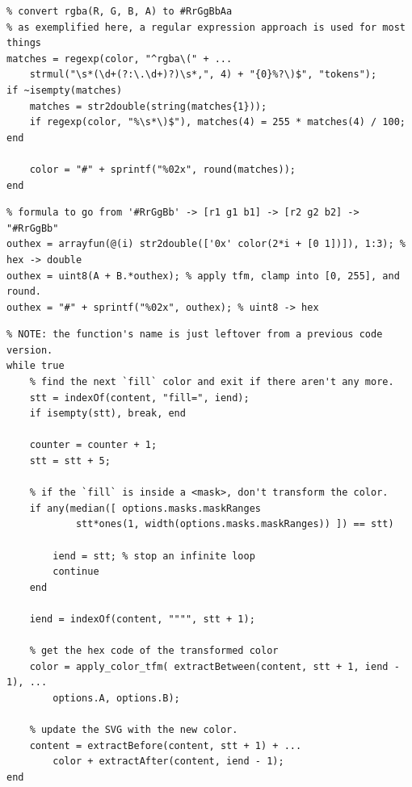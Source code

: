 \documentclass[12pt]{article}
\begin{document}
\vspace{-8px}
\begin{verbatim}
% convert rgba(R, G, B, A) to #RrGgBbAa
% as exemplified here, a regular expression approach is used for most things
matches = regexp(color, "^rgba\(" + ...
    strmul("\s*(\d+(?:\.\d+)?)\s*,", 4) + "{0}%?\)$", "tokens");
if ~isempty(matches)
    matches = str2double(string(matches{1}));
    if regexp(color, "%\s*\)$"), matches(4) = 255 * matches(4) / 100; end

    color = "#" + sprintf("%02x", round(matches));
end
\end{verbatim}
\vfill
{}\vspace{-8px}
\begin{verbatim}
% formula to go from '#RrGgBb' -> [r1 g1 b1] -> [r2 g2 b2] -> "#RrGgBb"
outhex = arrayfun(@(i) str2double(['0x' color(2*i + [0 1])]), 1:3); % hex -> double
outhex = uint8(A + B.*outhex); % apply tfm, clamp into [0, 255], and round.
outhex = "#" + sprintf("%02x", outhex); % uint8 -> hex
\end{verbatim}
\vfill
{}\vspace{-8px}
\begin{verbatim}
% NOTE: the function's name is just leftover from a previous code version.
while true
    % find the next `fill` color and exit if there aren't any more.
    stt = indexOf(content, "fill=", iend);
    if isempty(stt), break, end

    counter = counter + 1;
    stt = stt + 5;

    % if the `fill` is inside a <mask>, don't transform the color.
    if any(median([ options.masks.maskRanges
            stt*ones(1, width(options.masks.maskRanges)) ]) == stt)

        iend = stt; % stop an infinite loop
        continue
    end

    iend = indexOf(content, """", stt + 1);

    % get the hex code of the transformed color
    color = apply_color_tfm( extractBetween(content, stt + 1, iend - 1), ...
        options.A, options.B);

    % update the SVG with the new color.
    content = extractBefore(content, stt + 1) + ...
        color + extractAfter(content, iend - 1);
end
\end{verbatim}
\vfill
\vspace{-20px}
\pagebreak
\end{document}
